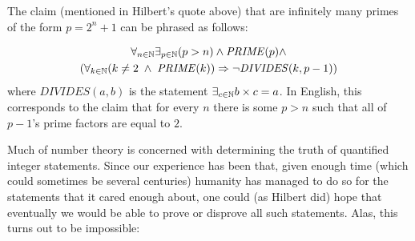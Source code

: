 The claim (mentioned in Hilbert's quote above) that are infinitely many
primes of the form \(p=2^n+1\) can be phrased as follows:

\[
\begin{gathered}
\forall_{n\in\N}\exists_{p\in\N} (p>n) \wedge \ensuremath{\mathit{PRIME}}(p) \wedge \\
\left(\forall_{k\in\N}  (k \neq 2 \; \wedge \; \ensuremath{\mathit{PRIME}}(k)) \Rightarrow \neg \ensuremath{\mathit{DIVIDES}}(k,p-1)\right)
\end{gathered}
\label{eqinfprimespowertwoplusone}
\] where \(\ensuremath{\mathit{DIVIDES}}(a,b)\) is the statement
\(\exists_{c\in{\mathbb{N}}} b\times c = a\). In English, this corresponds to the
claim that for every \(n\) there is some \(p>n\) such that all of
\(p-1\)'s prime factors are equal to \(2\).

\hypertarget{synsugarqisrem}{}

Much of number theory is concerned with determining the truth of
quantified integer statements. Since our experience has been that, given
enough time (which could sometimes be several centuries) humanity has
managed to do so for the statements that it cared enough about, one
could (as Hilbert did) hope that eventually we would be able to prove or
disprove all such statements. Alas, this turns out to be impossible:


